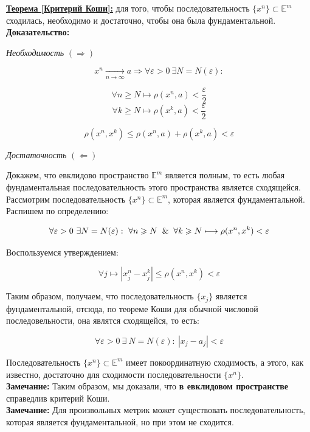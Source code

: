 \documentclass[a4paper,12pt]{article} %
\begin{document}
\underline{\textbf{Теорема [Критерий Коши]:}} для того, чтобы последовательность $\{x^n \} \subset \mathbb{E}^m$ сходилась, необходимо и достаточно, чтобы она была фундаментальной.\\

\textbf{Доказательство:} 

\textit{Необходимость} $(\Rightarrow)$

\[ x^n \xrightarrow[n \to \infty]{} a \Rightarrow \forall \varepsilon > 0 ~ \exists N = N(\varepsilon) : \]

\[ \forall n \geqslant N \mapsto \rho(x^n, a) < \frac{\varepsilon}{2} \]
\[ \forall k \geqslant N \mapsto \rho(x^k, a) < \frac{\varepsilon}{2} \]

\[ \rho(x^n, x^k) \leqslant \rho(x^n, a) + \rho(x^k, a) < \varepsilon \]

\textit{Достаточность} $(\Leftarrow)$ 

Докажем, что евклидово пространство $\mathbb{E}^m$ является полным, то есть любая фундаментальная последовательность этого пространства является сходящейся.\\

Рассмотрим последовательность $\{x^n \} \subset \mathbb{E}^m$, которая является фундаментальной. Распишем по определению:

$$ \forall \varepsilon > 0 ~ \exists N = N(\varepsilon) : ~ \forall n \geqslant N \And \forall k \geqslant N \longmapsto \rho(x^n, x^k) < \varepsilon $$

Воспользуемся утверждением:

\[ \forall j \longmapsto |x_j^n - x_j^k| \leqslant \rho(x^n, x^k) < \varepsilon \]

Таким образом, получаем, что последовательность $\{ x_j \}$ является фундаментальной, отсюда, по теореме Коши для обычной числовой последовельности, она являтся сходящейся, то есть:

\[ \forall \varepsilon > 0 ~ \exists ~ N = N(\varepsilon) : ~ |x_j - a_j| < \varepsilon \]

Последовательность $\{x^n \} \subset \mathbb{E}^m$  имеет покоординатную сходимость, а этого, как известно, достаточно для сходимости последовательности $\{x^n \}$.\\

\textbf{Замечание:} Таким образом, мы доказали, что \textbf{в евклидовом пространстве} справедлив критерий Коши.\\

\textbf{Замечание:} Для произвольных метрик может существовать последовательность, которая является фундаментальной, но при этом не сходится.\\
\end{document}
